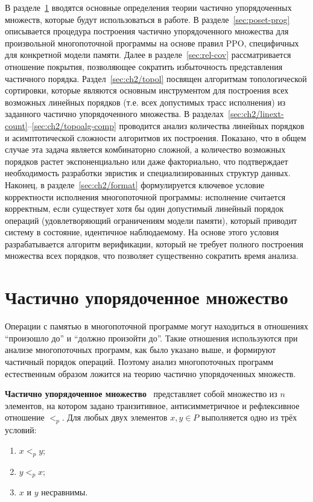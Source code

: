 В разделе~\ref{sec:poset} вводятся основные определения теории частично
упорядоченных множеств, которые будут использоваться в работе. В
разделе~\ref{sec:poset-prog} описывается процедура построения
частично упорядоченного
множества для произвольной многопоточной программы на основе правил
PPO, специфичных для конкретной модели памяти. Далее в разделе~\ref{sec:rel-cov}
рассматривается отношение покрытия, позволяющее сократить
избыточность представления частичного порядка.
Раздел~\ref{sec:ch2/topol} посвящен
алгоритмам топологической сортировки, которые являются основным
инструментом для построения всех возможных линейных порядков (т.е.
всех допустимых трасс исполнения) из заданного частично
упорядоченного множества.
В разделах~\ref{sec:ch2/linext-count}–\ref{sec:ch2/topoalg-comp}
проводится анализ количества линейных порядков и
асимптотической сложности алгоритмов их построения. Показано, что в
общем случае эта задача является комбинаторно сложной, а количество
возможных порядков растет экспоненциально или даже факториально, что
подтверждает необходимость разработки эвристик и специализированных
структур данных.
Наконец, в разделе~\ref{sec:ch2/format} формулируется ключевое
условие корректности
исполнения многопоточной программы: исполнение считается корректным,
если существует хотя бы один допустимый линейный порядок операций
(удовлетворяющий ограничениям модели памяти), который приводит
систему в состояние, идентичное наблюдаемому. На основе этого условия
разрабатывается алгоритм верификации, который не требует полного
построения множества всех порядков, что позволяет существенно
сократить время анализа.

\section{Частично упорядоченное множество}
\label{sec:poset}

Операции с памятью в многопоточной программе могут находиться в
отношениях ``произошло до'' и ``должно произойти до''. Такие
отношения используются при анализе многопоточных программ, как было
указано выше, и формируют частичный порядок операций. Поэтому анализ
многопоточных программ естественным образом ложится на теорию
частично упорядоченных множеств.

\textbf{Частично упорядоченное множество}~\cite{poset} представляет
собой множество из $n$ элементов, на котором задано транзитивное,
антисимметричное и рефлексивное отношение $<_{p}$. Для любых двух
элементов $x, y \in P$ выполняется одно из трёх условий:
\begin{enumerate}
  \item $x <_{p} y$;
  \item $y <_{p} x$;
  \item $x$ и $y$ несравнимы.
\end{enumerate}

